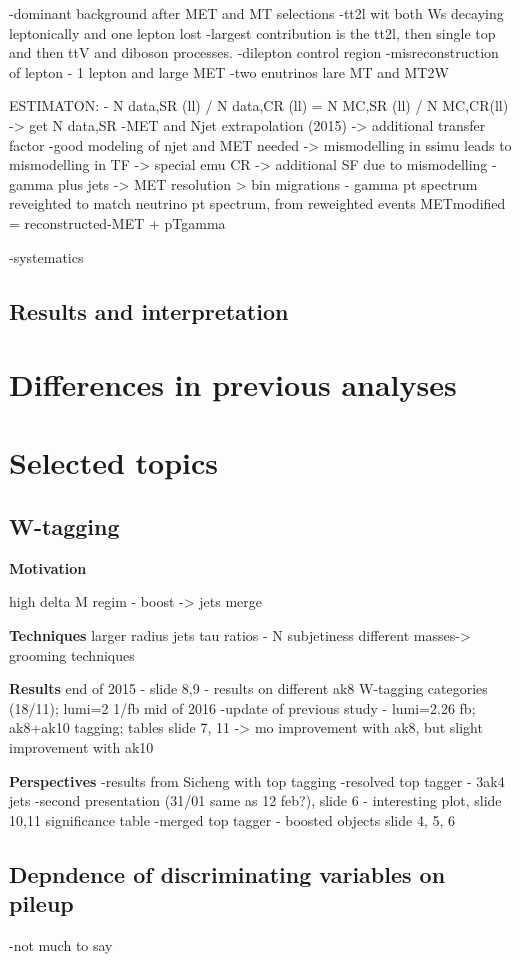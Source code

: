 -dominant background after MET and MT selections
-tt2l wit both Ws decaying leptonically and one lepton lost
-largest contribution is the tt2l, then single top and then ttV and diboson processes.
-dilepton control region
-misreconstruction of lepton - 1 lepton and large MET
-two enutrinos lare MT and MT2W

ESTIMATON:
- N data,SR (ll) / N data,CR (ll) = N MC,SR (ll) / N MC,CR(ll) -> get N data,SR
-MET and Njet extrapolation (2015) -> additional transfer factor
-good modeling of njet and MET needed -> mismodelling in ssimu leads to mismodelling in TF -> special emu CR -> additional SF due to mismodelling
-gamma plus jets -> MET resolution > bin migrations - gamma pt spectrum reveighted to match neutrino pt spectrum, from reweighted events METmodified = reconstructed-MET + pTgamma


-systematics

\subsection{Results and interpretation}

\section{Differences in previous analyses}

\section{Selected topics}

\subsection{W-tagging}

\textbf{Motivation}

	high delta M regim - boost -> jets merge

\textbf{Techniques}
	larger radius jets
	tau ratios - N subjetiness
	different masses-> grooming techniques
	
\textbf{Results}
	end of 2015 - slide 8,9 - results on different ak8 W-tagging categories (18/11); lumi=2 1/fb
	mid of 2016 -update of previous study - lumi=2.26 fb; ak8+ak10 tagging; tables slide 7, 11 -> mo improvement with ak8, but slight improvement with ak10 


\textbf{Perspectives}
	-results from Sicheng with top tagging
	-resolved top tagger - 3ak4 jets
	-second presentation (31/01 same as 12 feb?), slide 6 - interesting plot, slide 10,11 significance table
        -merged top tagger - boosted objects
		slide 4, 5, 6

\subsection{Depndence of discriminating variables on pileup}
-not much to say
	
